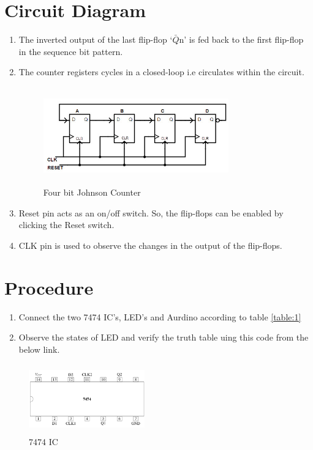 \documentclass[journal,12pt,twocolumn]{IEEEtran}
\begin{document}
    \vspace{2.5cm}   



\section{Circuit Diagram}
\begin{enumerate}
\item The inverted output of the last flip-flop ‘$\bar{Q}$n’ is fed back to the first flip-flop in the sequence bit pattern. 
\item The counter registers cycles in a closed-loop i.e circulates within the circuit.
\begin{figure}[h]
    \centering
    \includegraphics[width=8cm, height=4.2cm]{counter.jpg}
    
    \caption{Four bit Johnson Counter}

\end{figure}
\item Reset pin acts as an on/off switch. So, the flip-flops can be enabled by clicking the Reset switch.

\item CLK pin is used to observe the changes in the output of the flip-flops.
\end{enumerate}



\section{Procedure}
\begin{enumerate}
\item Connect the two 7474 IC's, LED's and Aurdino according to table \ref{table:1}
\item Observe the states of LED and verify the truth table uing this code from the below link.



\end{enumerate}

\begin{figure}[h]
\centering
    \includegraphics[width=5cm, height=3cm]{7474.png}
    
    \caption{7474 IC}

\end{figure}
\end{document}
